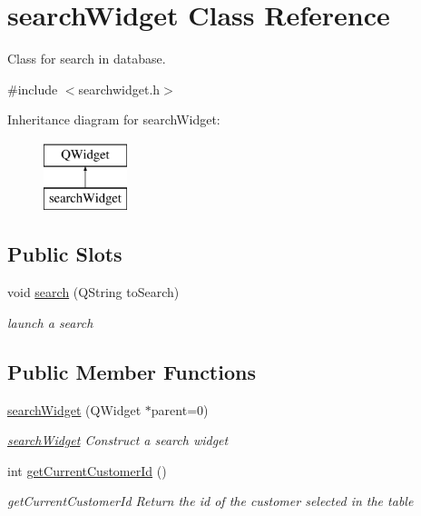 \hypertarget{classsearchWidget}{\section{search\+Widget Class Reference}
\label{classsearchWidget}
}


Class for search in database.  




{\ttfamily \#include $<$searchwidget.\+h$>$}

Inheritance diagram for search\+Widget\+:\begin{figure}[H]
\begin{center}
\leavevmode
\includegraphics[height=2.000000cm]{d2/dfd/classsearchWidget}
\end{center}
\end{figure}
\subsection*{Public Slots}
\begin{DoxyCompactItemize}
\item 
void \hyperlink{classsearchWidget_a15138eab0d8098a21c327bd34e328541}{search} (Q\+String to\+Search)
\begin{DoxyCompactList}\small\item\em launch a search \end{DoxyCompactList}\end{DoxyCompactItemize}
\subsection*{Public Member Functions}
\begin{DoxyCompactItemize}
\item 
\hyperlink{classsearchWidget_a0c712bf4f3c2105319645ce97e23eba9}{search\+Widget} (Q\+Widget $\ast$parent=0)
\begin{DoxyCompactList}\small\item\em \hyperlink{classsearchWidget}{search\+Widget} Construct a search widget \end{DoxyCompactList}\item 
int \hyperlink{classsearchWidget_ac74ae97eb8c147c89edc3dec3decf174}{get\+Current\+Customer\+Id} ()
\begin{DoxyCompactList}\small\item\em get\+Current\+Customer\+Id Return the id of the customer selected in the table \end{DoxyCompactList}\end{DoxyCompactItemize}


